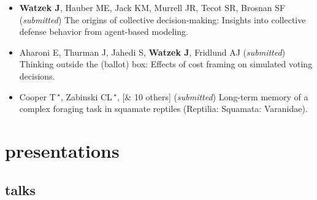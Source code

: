 \documentclass[]{friggeri-cv}
\begin{document}
\begin{itemize}[align=center]
  \item \textbf{Watzek J}, Hauber ME, Jack KM, Murrell JR, Tecot SR, Brosnan SF (\emph{submitted}) The origins of collective decision-making: Insights into collective defense behavior from agent-based modeling.
  \item Aharoni E, Thurman J, Jahedi S, \textbf{Watzek J}, Fridlund AJ (\emph{submitted}) Thinking outside the (ballot) box: Effects of cost framing on simulated voting decisions.
  \item Cooper T\,{\Large${}^\star$}, Zabinski CL\,{\Large${}^\star$}, [\& 10 others] (\emph{submitted}) Long-term memory of a complex foraging task in squamate reptiles (Reptilia: Squamata: Varanidae).

\end{itemize}


\section{presentations}


\subsection{talks}
\end{document}
